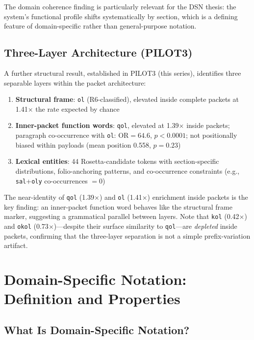 \documentclass[11pt,a4paper,twocolumn]{article}
\begin{document}
\noindent The domain coherence finding is particularly relevant for the DSN thesis: the system's functional profile shifts systematically by section, which is a defining feature of domain-specific rather than general-purpose notation.

\subsection{Three-Layer Architecture (PILOT3)}

A further structural result, established in PILOT3 (this series), identifies three separable layers within the packet architecture:

\begin{enumerate}[leftmargin=*,itemsep=2pt]
    \item \textbf{Structural frame}: \texttt{ol} (R6-classified), elevated inside complete packets at 1.41$\times$ the rate expected by chance
    \item \textbf{Inner-packet function words}: \texttt{qol}, elevated at 1.39$\times$ inside packets; paragraph co-occurrence with \texttt{ol}: $\mathrm{OR} = 64.6$, $p < 0.0001$; not positionally biased within payloads (mean position 0.558, $p = 0.23$)
    \item \textbf{Lexical entities}: 44 Rosetta-candidate tokens with section-specific distributions, folio-anchoring patterns, and co-occurrence constraints (e.g., \texttt{sal}+\texttt{oly} co-occurrences $= 0$)
\end{enumerate}

\noindent The near-identity of \texttt{qol} (1.39$\times$) and \texttt{ol} (1.41$\times$) enrichment inside packets is the key finding: an inner-packet function word behaves like the structural frame marker, suggesting a grammatical parallel between layers. Note that \texttt{kol} (0.42$\times$) and \texttt{okol} (0.73$\times$)---despite their surface similarity to \texttt{qol}---are \textit{depleted} inside packets, confirming that the three-layer separation is not a simple prefix-variation artifact.

\section{Domain-Specific Notation: Definition and Properties}
\label{sec:dsn}

\subsection{What Is Domain-Specific Notation?}
\end{document}
